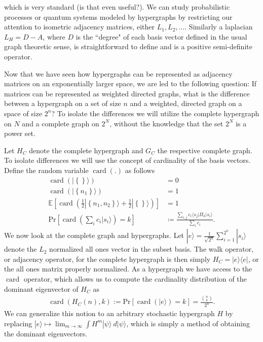 \documentclass{article}
\newcommand{\ket}[1]{|#1\rangle}
\newcommand{\bra}[1]{\langle #1|}
\newcommand{\ketbra}[2]{| #1\rangle\! \langle #2|}
\newcommand{\parens}[1]{\left( #1 \right)}
\newcommand{\brackets}[1]{\left[ #1 \right]}
\newcommand{\set}[1]{\left\{ #1 \right\}}
\newcommand{\expect}[1]{\mathbb{E}\brackets{#1}}
\newcommand{\prob}[1]{\text{Pr}\left[ #1 \right]}
\DeclareMathOperator{\card}{card}
\newcommand{\cardi}[1]{\card \parens{ #1 }}
\begin{document}
which is very standard (is that even useful?). We can study probabilistic processes or quantum systems modeled by hypergraphs by restricting our attention to isometric adjacency matrices, either $L_1, L_2, \ldots$. 
Similarly a laplacian $L_H = D - A$, where $D$ is the ``degree" of each basis vector defined in the usual graph theoretic sense, is straightforward to define and is a positive semi-definite operator. 

Now that we have seen how hypergraphs can be represented as adjacency matrices on an exponentially larger space, we are led to the following question: If matrices can be represented as weighted directed graphs, what is the difference between a hypergraph on a set of size $n$ and a weighted, directed graph on a space of size $2^n$? To isolate the differences we will utilize the complete hypergraph on $N$ and a complete graph on $2^N$, without the knowledge that the set $2^N$ is a power set. 

Let $H_C$ denote the complete hypergraph and $G_C$ the respective complete graph. To isolate differences we will use the concept of cardinality of the basis vectors. Define the random variable $\card(.)$ as follows
\begin{align}
    \card(\ket{\set{}}) &= 0 \\
    \card(\ket{\set{n_1}}) &= 1 \\
    \expect{\cardi{\frac{1}{2} \ket{\set{n_1, n_2}} + \frac{1}{2} \ket{\set{}} }} &= 1 \\
    \prob{\cardi{\sum_{i} c_i \ket{s_i}} = k } & \coloneqq \frac{\sum_{i,j} c_i \bra{s_j} \Pi_k \ket{s_i}}{ \sum_i c_i}.
\end{align}
We now look at the complete graph and hypergraphs. Let $\ket{e} = \frac{1}{\sqrt{2^n}} \sum_{i=1}^{2^n} \ket{s_i}$ denote the $L_2$ normalized all ones vector in the subset basis. The walk operator, or adjacency operator, for the complete hypergraph is then simply $H_C = \ketbra{e}{e}$, or the all ones matrix properly normalized. As a hypergraph we have access to the $\card$ operator, which allows us to compute the cardinality distribution of the dominant eigenvector of $H_C$ as
\begin{align}
    \cardi{H_C(n), k} := \prob{\cardi{\ket{e}} = k } = \frac{\binom{n}{k}}{2^n}.
\end{align}
We can generalize this notion to an arbitrary stochastic hypergraph $H$  by replacing $\ket{e} \mapsto \lim_{m \to \infty} \int H^m \ket{\psi} ~d\ket{\psi} $, which is simply a method of obtaining the dominant eigenvectors.
\end{document}
